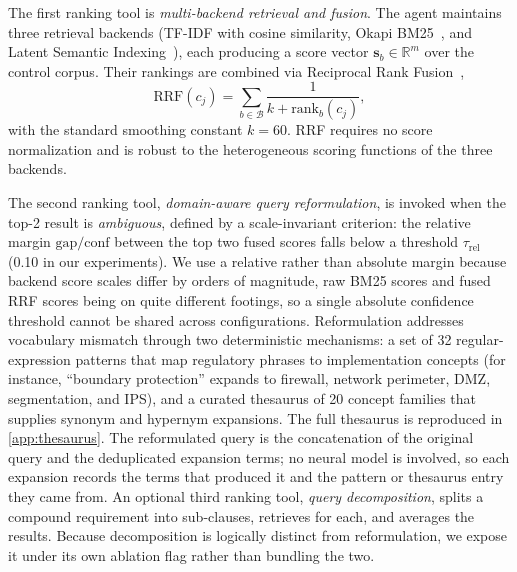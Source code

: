 \documentclass[smallextended,natbib]{svjour3}
\begin{document}
The first ranking tool is \emph{multi-backend retrieval and fusion}.
The agent maintains three retrieval backends (TF-IDF with cosine similarity, Okapi BM25~\citep{Robertson2009}, and Latent Semantic Indexing~\citep{MarcusMaletic2003}), each producing a score vector $\mathbf{s}_b \in \mathbb{R}^m$ over the control corpus.
Their rankings are combined via Reciprocal Rank Fusion~\citep{Cormack2009},
\begin{equation}
\text{RRF}(c_j) = \sum_{b \in \mathcal{B}} \frac{1}{k + \text{rank}_b(c_j)},
\end{equation}
with the standard smoothing constant $k = 60$.
RRF requires no score normalization and is robust to the heterogeneous scoring functions of the three backends.

The second ranking tool, \emph{domain-aware query reformulation}, is invoked when the top-2 result is \emph{ambiguous}, defined by a scale-invariant criterion: the relative margin $\text{gap}/\text{conf}$ between the top two fused scores falls below a threshold $\tau_{\text{rel}}$ (0.10 in our experiments). We use a relative rather than absolute margin because backend score scales differ by orders of magnitude, raw BM25 scores and fused RRF scores being on quite different footings, so a single absolute confidence threshold cannot be shared across configurations. Reformulation addresses vocabulary mismatch through two deterministic mechanisms: a set of 32 regular-expression patterns that map regulatory phrases to implementation concepts (for instance, ``boundary protection'' expands to firewall, network perimeter, DMZ, segmentation, and IPS), and a curated thesaurus of 20 concept families that supplies synonym and hypernym expansions.
The full thesaurus is reproduced in \ref{app:thesaurus}.
The reformulated query is the concatenation of the original query and the deduplicated expansion terms; no neural model is involved, so each expansion records the terms that produced it and the pattern or thesaurus entry they came from.
An optional third ranking tool, \emph{query decomposition}, splits a compound requirement into sub-clauses, retrieves for each, and averages the results. Because decomposition is logically distinct from reformulation, we expose it under its own ablation flag rather than bundling the two.
\end{document}
